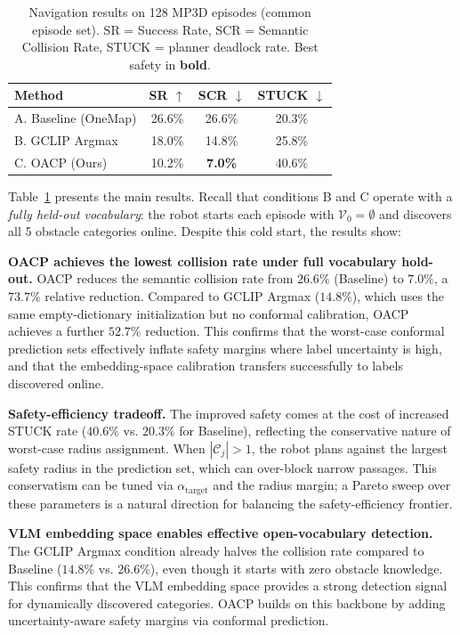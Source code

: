 \documentclass[letterpaper, 10 pt, conference]{ieeeconf}  %
\begin{document}
\begin{table}[t]
\caption{Navigation results on 128 MP3D episodes (common episode set). SR = Success Rate, SCR = Semantic Collision Rate, STUCK = planner deadlock rate. Best safety in \textbf{bold}.}
\label{tab:main_results}
\centering
\begin{tabular}{lccc}
\toprule
\textbf{Method} & \textbf{SR} $\uparrow$ & \textbf{SCR} $\downarrow$ & \textbf{STUCK} $\downarrow$ \\
\midrule
A. Baseline (OneMap) & 26.6\% & 26.6\% & 20.3\% \\
B. GCLIP Argmax      & 18.0\% & 14.8\% & 25.8\% \\
C. OACP (Ours)       & 10.2\% & \textbf{7.0\%}  & 40.6\% \\
\bottomrule
\end{tabular}
\end{table}

Table~\ref{tab:main_results} presents the main results. Recall that conditions B and C operate with a \textit{fully held-out vocabulary}: the robot starts each episode with $\mathcal{V}_0 = \emptyset$ and discovers all 5 obstacle categories online. Despite this cold start, the results show:

\textbf{OACP achieves the lowest collision rate under full vocabulary hold-out.}
OACP reduces the semantic collision rate from $26.6\%$ (Baseline) to $\mathbf{7.0\%}$, a $\mathbf{73.7\%}$ relative reduction. Compared to GCLIP Argmax ($14.8\%$), which uses the same empty-dictionary initialization but no conformal calibration, OACP achieves a further $52.7\%$ reduction. This confirms that the worst-case conformal prediction sets effectively inflate safety margins where label uncertainty is high, and that the embedding-space calibration transfers successfully to labels discovered online.

\textbf{Safety-efficiency tradeoff.}
The improved safety comes at the cost of increased STUCK rate ($40.6\%$ vs. $20.3\%$ for Baseline), reflecting the conservative nature of worst-case radius assignment. When $|\mathcal{C}_j| > 1$, the robot plans against the largest safety radius in the prediction set, which can over-block narrow passages. This conservatism can be tuned via $\alpha_{\text{target}}$ and the radius margin; a Pareto sweep over these parameters is a natural direction for balancing the safety-efficiency frontier.

\textbf{VLM embedding space enables effective open-vocabulary detection.}
The GCLIP Argmax condition already halves the collision rate compared to Baseline ($14.8\%$ vs. $26.6\%$), even though it starts with zero obstacle knowledge. This confirms that the VLM embedding space provides a strong detection signal for dynamically discovered categories. OACP builds on this backbone by adding uncertainty-aware safety margins via conformal prediction.
\end{document}
